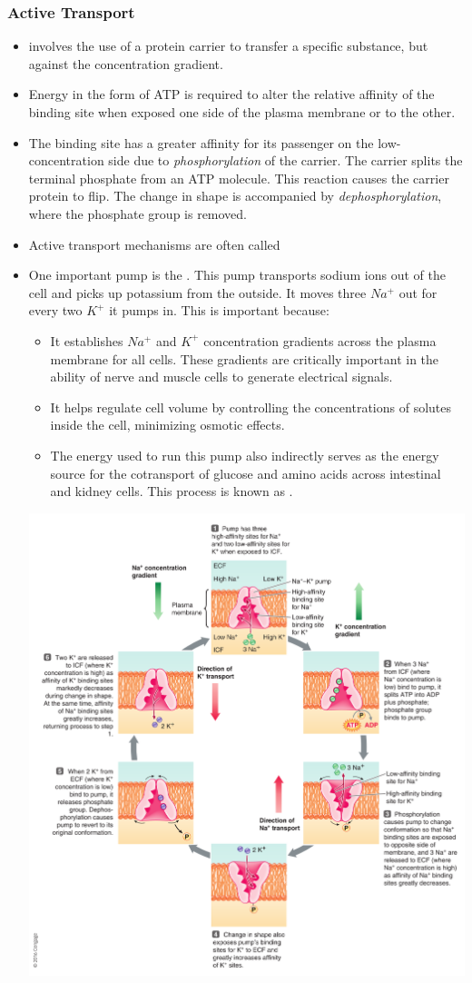 \documentclass{article}
\numberwithin{equation}{section}
\begin{document}
\subsubsection{Active Transport}
\begin{itemize}
    \item {} involves the use of a protein carrier to transfer a specific substance, but against the concentration gradient.
    \item Energy in the form of ATP is required to alter the relative affinity of the binding site when exposed one side of the plasma membrane or to the other.
    \item The binding site has a greater affinity for its passenger on the low-concentration side due to \textit{phosphorylation} of the carrier. The carrier splits the terminal phosphate from an ATP molecule. This reaction causes the carrier protein to flip. The change in shape is accompanied by \textit{dephosphorylation}, where the phosphate group is removed.
    \item Active transport mechanisms are often called 
    \item One important pump is the . This pump transports sodium ions out of the cell and picks up potassium from the outside. It moves three $Na^+$ out for every two $K^+$ it pumps in. This is important because:
    \begin{itemize}
        \item It establishes $Na^+$ and $K^+$ concentration gradients across the plasma membrane for all cells. These gradients are critically important in the ability of nerve and muscle cells to generate electrical signals.
        \item It helps regulate cell volume by controlling the concentrations of solutes inside the cell, minimizing osmotic effects.
        \item The energy used to run this pump also indirectly serves as the energy source for the cotransport of glucose and amino acids across intestinal and kidney cells. This process is known as .
    \end{itemize}
    \begin{center}
        \includegraphics[width=0.7\linewidth]{figures/sodium_postassium_pump.png}

\end{center}
\end{itemize}
\end{document}

